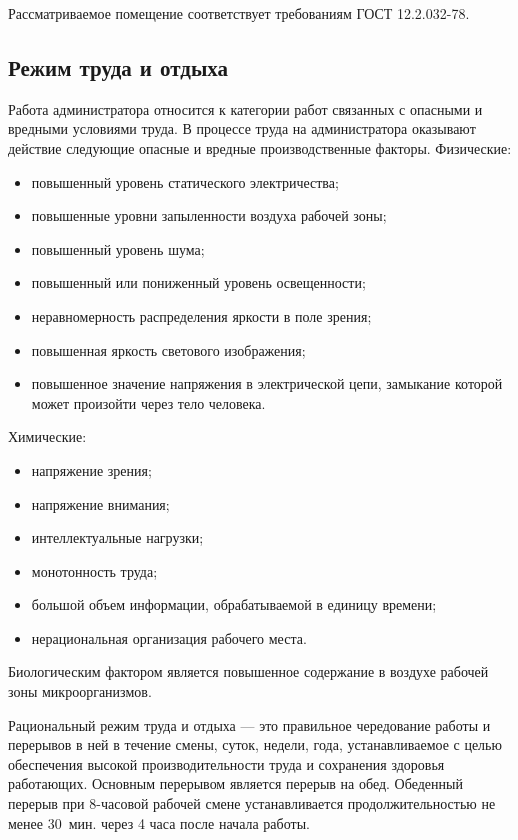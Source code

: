 Рассматриваемое помещение соответствует требованиям ГОСТ 12.2.032-78.
    	
\subsection{Режим труда и отдыха}

Работа администратора относится к категории работ связанных с опасными и вредными условиями труда.
В процессе труда на администратора оказывают действие следующие опасные и вредные производственные факторы.
Физические:
\begin{itemize}
  \item повышенный уровень статического электричества;
  \item повышенные уровни запыленности воздуха рабочей зоны;
  \item повышенный уровень шума;
  \item повышенный или пониженный уровень освещенности;
  \item неравномерность распределения яркости в поле зрения;
  \item повышенная яркость светового изображения;
  \item повышенное значение напряжения в электрической цепи, замыкание которой может произойти через тело человека.
\end{itemize}

Химические:
\begin{itemize}
  \item напряжение зрения;
  \item напряжение внимания;
  \item интеллектуальные нагрузки;
  \item монотонность труда;
  \item большой объем информации, обрабатываемой в единицу времени;
  \item нерациональная организация рабочего места.
\end{itemize}

Биологическим фактором является повышенное содержание в воздухе рабочей зоны микроорганизмов.

Рациональный режим труда и отдыха --- это правильное чередование работы и перерывов в ней в течение смены, суток, недели, года, устанавливаемое с целью обеспечения высокой производительности труда и сохранения здоровья работающих.
Основным перерывом является перерыв на обед.
Обеденный перерыв при 8-часовой рабочей смене устанавливается продолжительностью не менее 30~мин. через 4 часа после начала работы.

